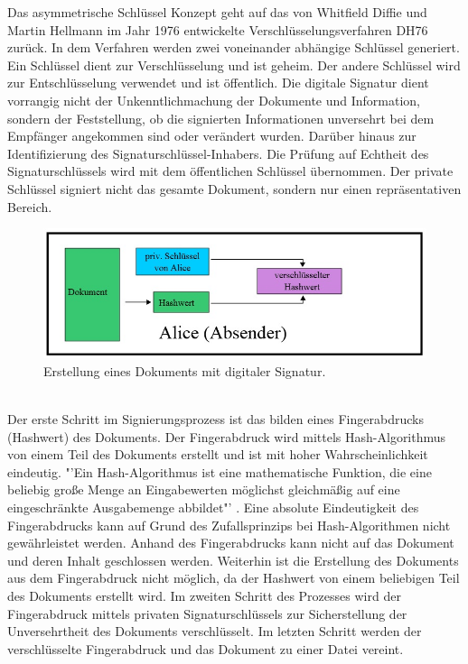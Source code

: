 Das asymmetrische Schlüssel Konzept geht auf das von Whitfield Diffie und Martin Hellmann im Jahr 1976 entwickelte Verschlüsselungsverfahren DH76 zurück. In dem Verfahren werden zwei voneinander abhängige Schlüssel generiert. Ein Schlüssel dient zur Verschlüsselung und ist geheim. Der andere Schlüssel wird zur Entschlüsselung verwendet und ist öffentlich. Die digitale Signatur dient vorrangig nicht der Unkenntlichmachung der Dokumente und Information, sondern der Feststellung, ob die signierten Informationen unversehrt bei dem Empfänger angekommen sind oder verändert wurden. Darüber hinaus zur Identifizierung des Signaturschlüssel-Inhabers. Die Prüfung auf Echtheit des Signaturschlüssels wird mit dem öffentlichen Schlüssel übernommen. Der private Schlüssel signiert nicht das gesamte Dokument, sondern nur einen repräsentativen Bereich. \cite{techno1}
\begin{figure}[!ht]
    \centering
    \includegraphics[width=\textwidth]{ErstellungAbsender2.jpg}
    \caption[Erstellung eines Dokuments mit digitaler Signatur]{\small{Erstellung eines Dokuments mit digitaler Signatur. \cite{techno3}}}
    \label{fig:2}
\end{figure}\\
Der erste Schritt im Signierungsprozess ist das bilden eines Fingerabdrucks (Hashwert) des Dokuments. Der Fingerabdruck wird mittels Hash-Algorithmus von einem Teil des Dokuments erstellt und ist mit hoher Wahrscheinlichkeit eindeutig. "'Ein Hash-Algorithmus ist eine mathematische Funktion, die eine beliebig große Menge an Eingabewerten möglichst gleichmäßig auf eine eingeschränkte Ausgabemenge abbildet"' \cite{techno2}. Eine absolute Eindeutigkeit des Fingerabdrucks kann auf Grund des Zufallsprinzips bei Hash-Algorithmen nicht gewährleistet werden. Anhand des Fingerabdrucks kann nicht auf das Dokument und deren Inhalt geschlossen werden. Weiterhin ist die Erstellung des Dokuments aus dem Fingerabdruck nicht möglich, da der Hashwert von einem beliebigen Teil des Dokuments erstellt wird. Im zweiten Schritt des Prozesses wird der Fingerabdruck mittels privaten Signaturschlüssels zur Sicherstellung der Unversehrtheit des Dokuments verschlüsselt. Im letzten Schritt werden der verschlüsselte Fingerabdruck und das Dokument zu einer Datei vereint. \cite{techno1}   